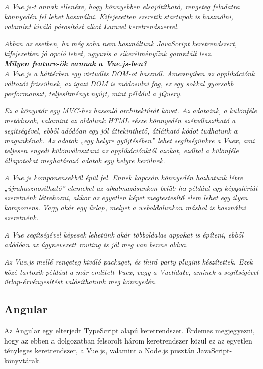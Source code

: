 \textit{A Vue.js-t annak ellenére, hogy könnyebben elsajátítható, rengeteg feladatra könnyedén fel lehet használni. Kifejezetten szeretik startupok is használni, valamint kiváló párosítást alkot Laravel keretrendszerrel.}

\textit{Abban az esetben, ha még soha nem használtunk JavaScript keretrendszert, kifejezetten jó opció lehet, ugyanis a sikerélményünk garantált lesz.}\\

\noindent\textit{\textbf{Milyen feature-ök vannak a Vue.js-ben?}}\\

\textit{A Vue.js a háttérben egy virtuális DOM-ot használ. Amennyiben az applikációnk változói frissülnek, az igazi DOM is módosulni fog, ez egy sokkal gyorsabb performanszt, teljesítményt nyújt, mint például a jQuery.}

\textit{Ez a könyvtár egy MVC-hez hasonló architektúrát követ. Az adataink, a különféle metódusok, valamint az oldalunk HTML része könnyedén szétválasztható a segítségével, ebből adódóan egy jól áttekinthető, átlátható kódot tudhatunk a magunkénak. Az adatok „egy helyre gyűjtésében” lehet segítségünkre a Vuex, ami teljesen engedi különválasztani az applikációnktól azokat, ezáltal a különféle állapotokat meghatározó adatok egy helyre kerülnek.}

\textit{A Vue.js komponensekből épül fel. Ennek kapcsán könnyedén hozhatunk létre „újrahasznosítható” elemeket az alkalmazásunkon belül: ha például egy képgalériát szeretnénk létrehozni, akkor az egyetlen képet megtestesítő elem lehet egy ilyen komponens. Vagy akár egy űrlap, melyet a weboldalunkon máshol is használni szeretnénk.}

\textit{A Vue segítségével képesek lehetünk akár többoldalas appokat is építeni, ebből adódóan az úgynevezett routing is jól meg van benne oldva.}

\textit{Az Vue.js mellé rengeteg kiváló packaget, és third party plugint készítettek. Ezek közé tartozik például a már említett Vuex, vagy a Vuelidate, aminek a segítségével űrlap-érvényesítést valósíthatunk meg könnyedén.}


\subsection{Angular}

Az Angular egy elterjedt TypeScript alapú keretrendszer. Érdemes megjegyezni, hogy az ebben a dolgozatban felsorolt három keretrendszer közül ez az egyetlen tényleges keretrendszer, a Vue.js, valamint a Node.js pusztán JavaScript-könyvtárak.

